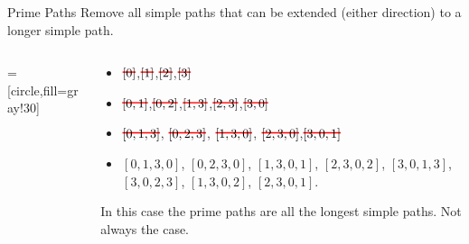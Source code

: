\documentclass[handout]{beamer}
\newcommand\hcancel[2][red]{\setbox0=\hbox{$#2$}%
\rlap{\raisebox{.45\ht0}{\textcolor{#1}{\rule{\wd0}{1pt}}}}#2}
\begin{document}
\begin{frame}{Prime Paths}
Remove all simple paths that can be extended (either direction) to a longer simple path.
\begin{columns}
\begin{column}{0.3\textwidth}    
 =[circle,fill=gray!30]
\end{column}
\begin{column}{0.6\textwidth}
  \begin{itemize}
  \item $\hcancel{[0]}$,$\hcancel{[1]}$,$\hcancel{[2]}$,$\hcancel{[3]}$
  \item $\hcancel{[0,1]}$,$\hcancel{[0,2]}$,$\hcancel{[1,3]}$,$\hcancel{[2,3]}$,$\hcancel{[3,0]}$
  \item $\hcancel{[ 0,1,3]}$, $\hcancel{[0,2,3]}$, $\hcancel{[1,3,0]}$, $\hcancel{[2,3,0]}$,$\hcancel{[3,0,1]}$
  \item $[ 0, 1, 3, 0 ]$, $[ 0, 2, 3, 0]$, $[ 1, 3, 0, 1 ]$,
$[ 2, 3, 0, 2 ]$, $[ 3, 0, 1, 3 ]$, $[ 3, 0, 2, 3 ]$, $[ 1, 3, 0, 2 ]$,
$[ 2, 3, 0, 1 ]$.
  \end{itemize}
In this case the prime paths are all the longest simple paths. Not
always the case. 
\end{column}
\end{columns}
  
\end{frame}
\end{document}
